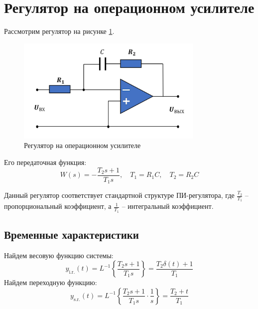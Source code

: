 \section{Регулятор на операционном усилителе}
Рассмотрим регулятор на рисунке \ref{fig:task5_reg}.
\begin{figure}[ht!]
    \centering
    \includegraphics[width=0.8\textwidth]{media/reg.png}
    \caption{Регулятор на операционном усилителе}
    \label{fig:task5_reg}
\end{figure}
Его передаточная функция:
\begin{equation}
    W(s) = -\frac{T_2s + 1}{T_1s}, \quad T_1 = R_1C, \quad T_2 = R_2C
\end{equation}

Данный регулятор соответствует стандартной структуре ПИ-регулятора, где $\frac{T_2}{T_1}$ -- пропорциональный коэффициент, а $\frac{1}{T_1}$ -- интегральный коэффициент.

\subsection{Временные характеристики}
\noindent Найдем весовую функцию системы:
\begin{equation}
    y_{\text{i.r.}}(t) = L^{-1}\left\{\frac{T_2s + 1}{T_1s}\right\} = \frac{T_2\delta(t) + 1}{T_1}
\end{equation}
Найдем переходную функцию:
\begin{equation}
    y_{\text{s.r.}}(t) = L^{-1}\left\{\frac{T_2s + 1}{T_1s}\cdot\frac{1}{s}\right\} = \frac{T_2 + t}{T_1}
\end{equation}

